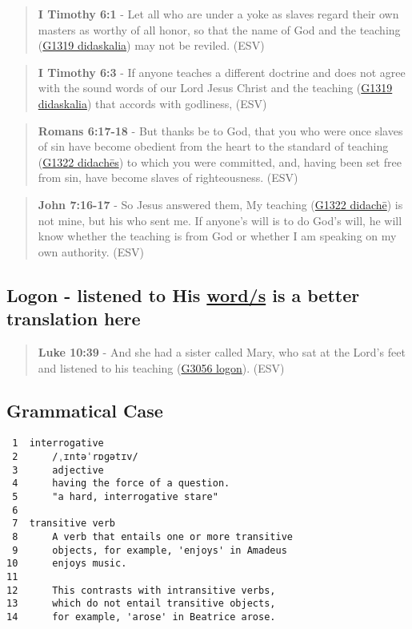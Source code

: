 \documentclass[11pt]{article}
\begin{document}
\begin{quote}
\textbf{I Timothy 6:1} - Let all who are under a yoke as slaves regard their own masters as worthy of all honor, so that the name of God and the teaching (\href{https://biblehub.com/greek/1319.htm}{G1319 didaskalia}) may not be reviled. (ESV)
\end{quote}

\begin{quote}
\textbf{I Timothy 6:3} - If anyone teaches a different doctrine and does not agree with the sound words of our Lord Jesus Christ and the teaching (\href{https://biblehub.com/greek/1319.htm}{G1319 didaskalia}) that accords with godliness, (ESV)
\end{quote}

\begin{quote}
\textbf{Romans 6:17-18} - But thanks be to God, that you who were once slaves of sin have become obedient from the heart to the standard of teaching (\href{https://biblehub.com/greek/1322.htm}{G1322 didachēs}) to which you were committed, and, having been set free from sin, have become slaves of righteousness. (ESV)
\end{quote}

\begin{quote}
\textbf{John 7:16-17} - So Jesus answered them, My teaching (\href{https://biblehub.com/greek/1321.htm}{G1322 didachē}) is not mine, but his who sent me. If anyone's will is to do God's will, he will know whether the teaching is from God or whether I am speaking on my own authority. (ESV)
\end{quote}

\subsection{Logon - listened to His \underline{word/s} is a better translation here}
\label{sec:org1cc1ad3}
\begin{quote}
\textbf{Luke 10:39} - And she had a sister called Mary, who sat at the Lord's feet and listened to his teaching (\href{https://biblehub.com/greek/3056.htm}{G3056 logon}). (ESV)
\end{quote}

\subsection{Grammatical Case}
\label{sec:orgbeb102a}

\begin{verbatim}
 1  interrogative
 2      /ˌɪntəˈrɒɡətɪv/
 3      adjective
 4      having the force of a question.
 5      "a hard, interrogative stare"
 6  
 7  transitive verb
 8      A verb that entails one or more transitive
 9      objects, for example, 'enjoys' in Amadeus
10      enjoys music.
11  
12      This contrasts with intransitive verbs,
13      which do not entail transitive objects,
14      for example, 'arose' in Beatrice arose.
\end{verbatim}
\end{document}
